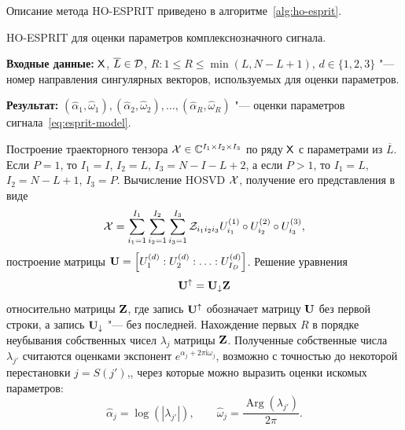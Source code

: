 \documentclass[specialist,
  substylefile=spbu.rtx,
subf,href,colorlinks=true, 12pt]{disser}
\theoremstyle{plain}
\theoremstyle{definition}
\theoremstyle{remark}
\newcommand{\Input}{\textbf{Входные данные: }}
\newcommand{\Output}{\textbf{Результат: }}
\newcommand{\iu}{\mathrm{i}}
\begin{document}
Описание метода HO-ESPRIT приведено в алгоритме~\ref{alg:ho-esprit}.
\begin{algorithm}[!ht]
  \caption{HO-ESPRIT для оценки параметров комплекснозначного сигнала.}
  \label{alg:ho-esprit}
  \Input $\mathsf{X}$, $\overline{L} \in \mathcal{D}$, $R: 1 \leqslant R\leqslant \min(L, N-L+1)$,
  $d\in \{1, 2, 3\}$ "--- номер направления сингулярных векторов,
  используемых для оценки параметров.

  \Output $\left(\widehat{\alpha}_1, \widehat{\omega}_1\right),
  \left(\widehat{\alpha}_2, \widehat{\omega}_2\right), \ldots,
  \left(\widehat{\alpha}_R, \widehat{\omega}_R\right)$ "--- оценки параметров
  сигнала~\eqref{eq:esprit-model}.
  \begin{algorithmic}[1]
    \State Построение траекторного тензора $\mathcal{X}\in \mathbb{C}^{I_1\times I_2 \times I_3}$
    по ряду $\mathsf{X}$ с параметрами из $\overline{L}$.
    Если $P=1$, то $I_1=I$, $I_2=L$, $I_3=N-I-L+2$, а если
    $P>1$, то $I_1=L$, $I_2=N-L+1$, $I_3=P$.
    \State Вычисление HOSVD $\mathcal{X}$, получение его представления в виде
    \[
      \mathcal{X} = \sum_{i_1=1}^{I_1} \sum_{i_2=1}^{I_2} \sum_{i_3=1}^{I_3}
      \mathcal{Z}_{i_1 i_2 i_3} U_{i_1}^{(1)}\circ U_{i_2}^{(2)} \circ U_{i_3}^{(3)},
    \]
    построение матрицы $\mathbf{U} = \left[U_1^{(d)}:U_2^{(d)}:\ldots: U_{I_D}^{(d)}\right]$.
    \State Решение уравнения
    \[
      \mathbf{U}^{\uparrow}=\mathbf{U}_{\downarrow}\mathbf{Z}
    \]
    относительно матрицы $\mathbf{Z}$, где запись $\mathbf{U}^{\uparrow}$ обозначает матрицу $\mathbf{U}$ без первой строки,
    а запись $\mathbf{U}_{\downarrow}$ "--- без последней.
    \State Нахождение первых $R$ в порядке неубывания собственных чисел $\lambda_j$ матрицы $\mathbf{Z}$.
    Полученные собственные числа $\lambda_{j'}$ считаются оценками
    экспонент $e^{\alpha_j + 2\pi\iu \omega_j}$, возможно с точностью до некоторой перестановки
    $j = S (j')$,, через которые можно выразить
    оценки искомых параметров:
    \[
      \widehat{\alpha}_j = \log\left(\left|\lambda_{j'}\right|\right), \qquad
      \widehat{\omega}_j = \frac{\operatorname{Arg}\left(\lambda_{j'}\right)}{2 \pi}.
    \]
  \end{algorithmic}
\end{algorithm}
\end{document}
